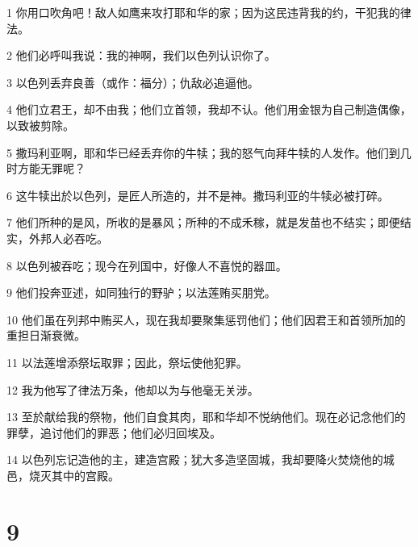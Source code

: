 \par 1 你用口吹角吧！敌人如鹰来攻打耶和华的家；因为这民违背我的约，干犯我的律法。
\par 2 他们必呼叫我说：我的神啊，我们以色列认识你了。
\par 3 以色列丢弃良善（或作：福分）；仇敌必追逼他。
\par 4 他们立君王，却不由我；他们立首领，我却不认。他们用金银为自己制造偶像，以致被剪除。
\par 5 撒玛利亚啊，耶和华已经丢弃你的牛犊；我的怒气向拜牛犊的人发作。他们到几时方能无罪呢？
\par 6 这牛犊出於以色列，是匠人所造的，并不是神。撒玛利亚的牛犊必被打碎。
\par 7 他们所种的是风，所收的是暴风；所种的不成禾稼，就是发苗也不结实；即便结实，外邦人必吞吃。
\par 8 以色列被吞吃；现今在列国中，好像人不喜悦的器皿。
\par 9 他们投奔亚述，如同独行的野驴；以法莲贿买朋党。
\par 10 他们虽在列邦中贿买人，现在我却要聚集惩罚他们；他们因君王和首领所加的重担日渐衰微。
\par 11 以法莲增添祭坛取罪；因此，祭坛使他犯罪。
\par 12 我为他写了律法万条，他却以为与他毫无关涉。
\par 13 至於献给我的祭物，他们自食其肉，耶和华却不悦纳他们。现在必记念他们的罪孽，追讨他们的罪恶；他们必归回埃及。
\par 14 以色列忘记造他的主，建造宫殿；犹大多造坚固城，我却要降火焚烧他的城邑，烧灭其中的宫殿。

\chapter{9}

